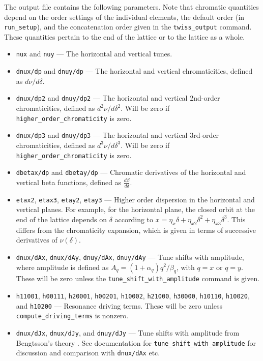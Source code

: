 \documentclass[11pt]{article}
\begin{document}
The output file contains the following parameters.  Note that chromatic quantities depend on the order 
settings of the individual elements, the default order (in \verb|run_setup|), and the concatenation order
given in the \verb|twiss_output| command.  These quantities pertain to the end of the lattice or to the
lattice as a whole.
\begin{itemize}
\item {\tt nux} and {\tt nuy} --- The horizontal and vertical tunes.
\item {\tt dnux/dp} and {\tt dnuy/dp} --- The horizontal and vertical chromaticities, defined as $d\nu/d\delta$.
\item {\tt dnux/dp2} and {\tt dnuy/dp2} --- The horizontal and vertical 2nd-order chromaticities, 
  defined as $d^2\nu/d\delta^2$.  Will be zero if \verb|higher_order_chromaticity| is zero.
\item {\tt dnux/dp3} and {\tt dnuy/dp3} --- The horizontal and vertical 3rd-order chromaticities, 
  defined as $d^3\nu/d\delta^3$.  Will be zero if \verb|higher_order_chromaticity| is zero.
\item {\tt dbetax/dp} and {\tt dbetay/dp} --- Chromatic derivatives of the horizontal and vertical beta functions,
defined as $\frac{d\beta}{d\delta}$.
\item {\tt etax2}, {\tt etax3}, {\tt etay2}, {\tt etay3} --- Higher order dispersion in the horizontal and
  vertical planes.  For example, for the horizontal plane, the closed orbit at the end of the lattice 
  depends on $\delta$ according to
  $x = \eta_x\delta + \eta_{x2} \delta^2 + \eta_{x3}\delta^3$.  This differs from the chromaticity expansion,
  which is given in terms of successive derivatives of $\nu(\delta)$.
\item {\tt dnux/dAx}, {\tt dnux/dAy}, {\tt dnuy/dAx}, {\tt dnuy/dAy} --- Tune shifts with amplitude, where amplitude
  is defined as $A_q = (1 + \alpha_q) q^2/\beta_q$, with $q=x$ or $q=y$.  These will
  be zero unless the \verb|tune_shift_with_amplitude| command is given.
\item {\tt h11001}, {\tt h00111}, {\tt h20001}, {\tt h00201}, {\tt h10002}, {\tt h21000}, {\tt h30000}, 
 {\tt h10110}, {\tt h10020}, and {\tt h10200} --- Resonance driving terms\cite{Bengtsson}.  These will be
 zero unless \verb|compute_driving_terms| is nonzero.
\item {\tt dnux/dJx}, {\tt dnux/dJy},  and {\tt dnuy/dJy} --- Tune shifts with amplitude from Bengtsson's theory \cite{Bengtsson}.
 See documentation for \verb|tune_shift_with_amplitude| for discussion and comparison with {\tt dnux/dAx} etc.

\end{itemize}
\end{document}
